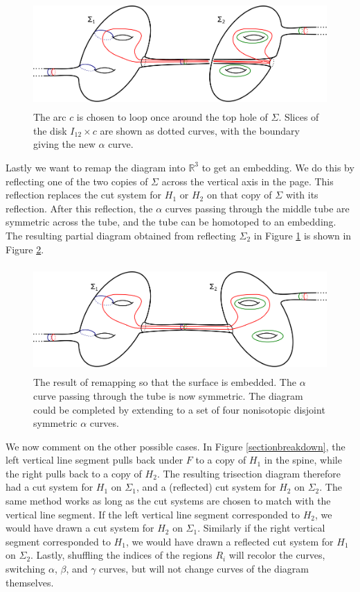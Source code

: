 \documentclass[12pt]{amsart}
\newcommand{\R}{\mathbb{R}}
\theoremstyle{definition}
\theoremstyle{remark}
\begin{document}
\begin{figure}[h]
\centering
\includegraphics[height=1.6in]{coresubsurfacediagram.png}
\caption{The arc $c$ is chosen to loop once around the top hole of $\Sigma$.  Slices of the disk $I_{12} \times c$ are shown as dotted curves, with the boundary giving the new $\alpha$ curve.}
\label{fig_coresubsurfacediagram}
\end{figure}

Lastly we want to remap the diagram into $\R^3$ to get an embedding.  We do this by reflecting one of the two copies of $\Sigma$ across the vertical axis in the page.  This reflection replaces the cut system for $H_1$ or $H_2$ on that copy of $\Sigma$ with its reflection.  After this reflection, the $\alpha$ curves passing through the middle tube are symmetric across the tube, and the tube can be homotoped to an embedding.  The resulting partial diagram obtained from reflecting $\Sigma_2$ in Figure \ref{fig_coresubsurfacediagram} is shown in Figure \ref{fig_coresubsurfacediagram_embedded}.

\begin{figure}[h]
\centering
\includegraphics[height=1.6in]{coresubsurfacediagram_embedded.png}
\caption{The result of remapping so that the surface is embedded.  The $\alpha$ curve passing through the tube is now symmetric.  The diagram could be completed by extending to a set of four nonisotopic disjoint symmetric $\alpha$ curves.}
\label{fig_coresubsurfacediagram_embedded}
\end{figure}

We now comment on the other possible cases.  In Figure \ref{sectionbreakdown}, the left vertical line segment pulls back under $F$ to a copy of $H_1$ in the spine, while the right pulls back to a copy of $H_2$.  The resulting trisection diagram therefore had a cut system for $H_1$ on $\Sigma_1$, and a (reflected) cut system for $H_2$ on $\Sigma_2$.  The same method works as long as the cut systems are chosen to match with the vertical line segment.  If the left vertical line segment corresponded to $H_2$, we would have drawn a cut system for $H_2$ on $\Sigma_1$.  Similarly if the right vertical segment corresponded to $H_1$, we would have drawn a reflected cut system for $H_1$ on $\Sigma_2$.  Lastly, shuffling the indices of the regions $R_i$ will recolor the curves, switching $\alpha$, $\beta$, and $\gamma$ curves, but will not change curves of the diagram themselves.
\end{document}
